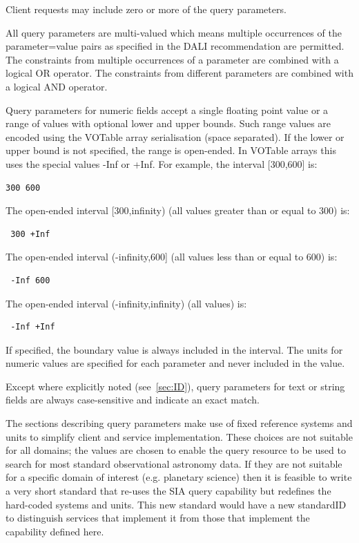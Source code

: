 \documentclass[11pt,a4paper]{ivoa}
\begin{document}
Client requests may include zero or more of the query parameters.

All query parameters are multi-valued which means multiple occurrences of the parameter=value pairs as specified in the DALI recommendation are permitted. The constraints from multiple occurrences of a parameter are combined with a logical OR operator. The constraints from different parameters are combined with a logical AND operator.

Query parameters for numeric fields accept a single floating point value or a range of values with optional lower and upper bounds. Such range values are encoded using the VOTable array serialisation (space separated). If  the lower or upper bound is not specified, the range is open-ended. In VOTable arrays this uses the special values -Inf or +Inf. For example, the interval [300,600] is:

\begin{lstlisting}
300 600 
\end{lstlisting}
The open-ended interval [300,infinity) (all values greater than or equal to 300) is:

\begin{lstlisting}
 300 +Inf 
\end{lstlisting}
The open-ended interval (-infinity,600] (all values less than or equal to 600) is:

\begin{lstlisting}
 -Inf 600 
\end{lstlisting}
 The open-ended interval (-infinity,infinity) (all values) is: 

\begin{lstlisting}
 -Inf +Inf 
\end{lstlisting}
If specified, the boundary value is always included in the interval.
The units for numeric values are specified for each parameter and never included in the value.
 
Except where explicitly noted (see~\ref{sec:ID}), query parameters for text or string fields are always case-sensitive and indicate an exact match. 

The sections describing query parameters make use of fixed reference systems and units to simplify client and service implementation. These choices are not suitable for all domains; the values are chosen to enable the {query} resource to be used to search for most standard observational astronomy data. If they are not suitable for a specific domain of interest (e.g. planetary science) then it is feasible to write a very short standard that re-uses the SIA {query} capability but redefines the hard-coded systems and units. This new standard would have a new standardID to distinguish services that implement it from those that implement the capability defined here.
\end{document}
